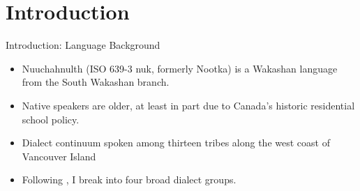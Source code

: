 \section{Introduction}

\begin{frame}{Introduction: Language Background}
\begin{itemize}
\item Nuuchahnulth (ISO 639-3 nuk, formerly Nootka) is a Wakashan language from the South Wakashan branch.
\item Native speakers are older, at least in part due to Canada's historic residential school policy.
\item Dialect continuum spoken among thirteen tribes along the west coast of Vancouver Island
\item Following \cite{werle2013dialects}, I break into four broad dialect groups.
\end{itemize}
\end{frame}

